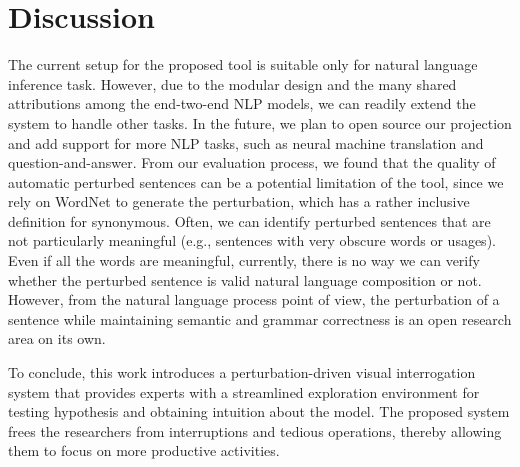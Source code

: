 \section{Discussion}
The current setup for the proposed tool is suitable only for natural language inference task. However, due to the modular design and the many shared attributions among the end-two-end NLP models, we can readily extend the system to handle other tasks. In the future, we plan to open source our projection and add support for more NLP tasks, such as neural machine translation and question-and-answer.
%
From our evaluation process, we found that the quality of automatic perturbed sentences can be a potential limitation of the tool, since we rely on WordNet to generate the perturbation, which has a rather inclusive definition for synonymous. Often, we can identify perturbed sentences that are not particularly meaningful (e.g., sentences with very obscure words or usages). 
Even if all the words are meaningful, currently, there is no way we can verify whether the perturbed sentence is valid natural language composition or not.
%
However, from the natural language process point of view, the perturbation of a sentence while maintaining semantic and grammar correctness is an open research area on its own. 

To conclude, this work introduces a perturbation-driven visual interrogation system that provides experts with a streamlined exploration environment for testing hypothesis and obtaining intuition about the model. The proposed system frees the researchers from interruptions and tedious operations, thereby allowing them to focus on more productive activities.

